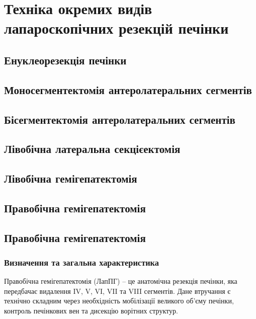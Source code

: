 \chapter{Техніка окремих видів лапароскопічних резекцій печінки} 

\begin{refsection}

\section{Енуклеорезекція печінки}


\section{Моносегментектомія антеролатеральних сегментів}

\section{Бісегментектомія антеролатеральних сегментів}

\section{Лівобічна латеральна секцієектомія}

\section{Лівобічна гемігепатектомія}

\section{Правобічна гемігепатектомія}

\section{Правобічна гемігепатектомія}

\subsection{Визначення та загальна характеристика}
Правобічна гемігепатектомія (ЛапПГ) – це анатомічна резекція печінки, яка передбачає видалення IV, V, VI, VII та VIII сегментів. Дане втручання є технічно складним через необхідність мобілізації великого об’єму печінки, контроль печінкових вен та дисекцію ворітних структур.


\end{refsection}
